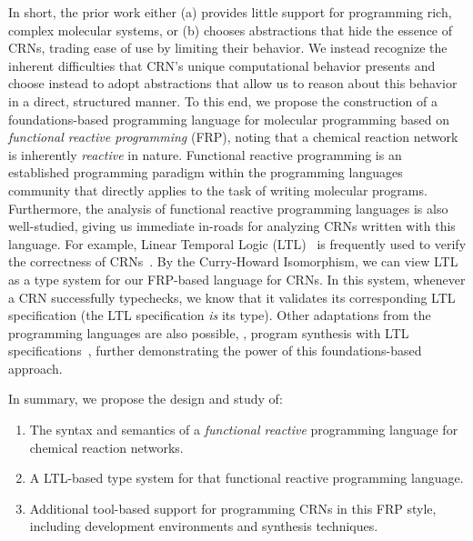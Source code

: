 In short, the prior work either (a) provides little support for programming rich, complex molecular systems, or (b) chooses abstractions that hide the essence of CRNs, trading ease of use by limiting their behavior.
We instead recognize the inherent difficulties that CRN's unique computational behavior presents and choose instead to adopt abstractions that allow us to reason about this behavior in a direct, structured manner.
To this end, we propose the construction of a foundations-based programming language for molecular programming based on \emph{functional reactive programming} (FRP), noting that a chemical reaction network is inherently \emph{reactive} in nature.
Functional reactive programming is an established programming paradigm within the programming languages community that directly applies to the task of writing molecular programs.
Furthermore, the analysis of functional reactive programming languages is also well-studied, giving us immediate in-roads for analyzing CRNs written with this language.
For example, Linear Temporal Logic (LTL)~\cite{pnueli1997,manna2012temporal,oBaiKat08} is frequently used to verify the correctness of CRNs~\cite{jKwiTha14,cEHKLLL14,jEKLLLM17}.
By the Curry-Howard Isomorphism, we can view LTL as a type system for our FRP-based language for CRNs.
In this system, whenever a CRN successfully typechecks, we know that it validates its corresponding LTL specification (the LTL specification \emph{is} its type).
Other adaptations from the programming languages are also possible, \eg, program synthesis with LTL specifications~\cite{finkbeiner2019}, further demonstrating the power of this foundations-based approach.

In summary, we propose the design and study of:
\begin{enumerate}[itemsep=0pt]
  \item The syntax and semantics of a \emph{functional reactive} programming language for chemical reaction networks.
  \item A LTL-based type system for that functional reactive programming language.
  \item Additional tool-based support for programming CRNs in this FRP style, including development environments and synthesis techniques.
\end{enumerate}



